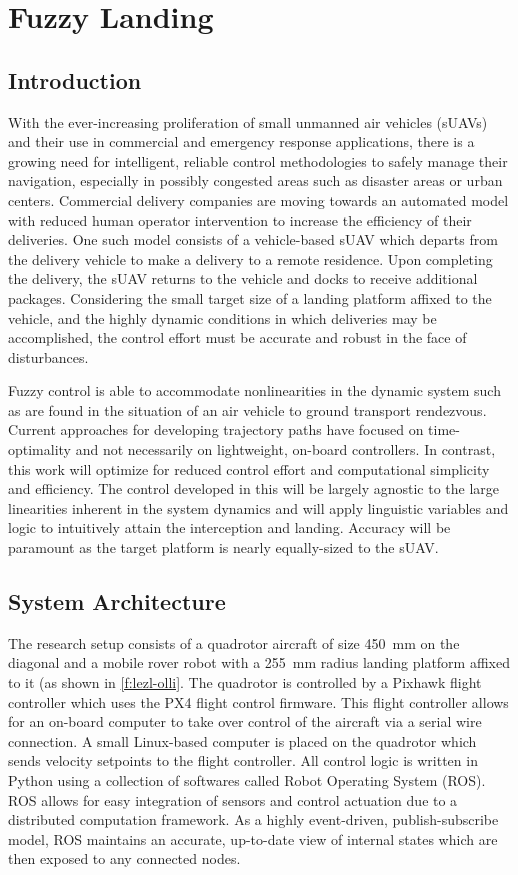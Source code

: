\chapter{Fuzzy Landing}\label{c:landing}
\section{Introduction}
With the ever-increasing proliferation of small unmanned air vehicles (sUAVs) and their use in commercial and
emergency response applications, there is a growing need for intelligent, reliable control methodologies to
safely manage their navigation, especially in possibly congested areas such as disaster areas or urban
centers. Commercial delivery companies are moving towards an automated model with reduced human operator
intervention to increase the efficiency of their deliveries. One such model consists of a vehicle-based sUAV
which departs from the delivery vehicle to make a delivery to a remote residence. Upon completing the
delivery, the sUAV returns to the vehicle and docks to receive additional packages. Considering the small
target size of a landing platform affixed to the vehicle, and the highly dynamic conditions in which
deliveries may be accomplished, the control effort must be accurate and robust in the face of disturbances.

Fuzzy control is able to accommodate nonlinearities in the dynamic system such as are found in the situation
of an air vehicle to ground transport rendezvous\cite{Ionita_2005}. Current approaches for
developing trajectory paths have focused on time-optimality\cite{Adams_2012}\cite{Hehn_2012} and not
necessarily on lightweight, on-board controllers. In contrast, this work will optimize for reduced control
effort and computational simplicity and efficiency. The control developed in this will be largely agnostic to
the large linearities inherent in the system dynamics and will apply linguistic variables and logic to
intuitively attain the interception and landing. Accuracy will be paramount as the target platform is nearly
equally-sized to the sUAV.

\section{System Architecture}
The research setup consists of a quadrotor aircraft of size \SI{450}{\mm} on the diagonal and a mobile rover
robot with a \SI{255}{mm} radius landing platform affixed to it (as shown in \cref{f:lezl-olli}. The quadrotor
is controlled by a Pixhawk flight controller which uses the PX4 flight control firmware. This flight
controller allows for an on-board computer to take over control of the aircraft via a serial wire connection.
A small Linux-based computer is placed on the quadrotor which sends velocity setpoints to the flight
controller. All control logic is written in Python using a collection of softwares called Robot Operating
System (ROS). ROS allows for easy integration of sensors and control actuation due to a distributed
computation framework. As a highly event-driven, publish-subscribe model, ROS maintains an accurate,
up-to-date view of internal states which are then exposed to any connected nodes.

